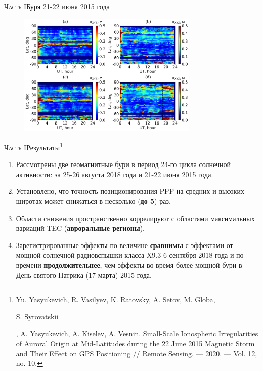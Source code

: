 \begin{frame}{\textsc{Часть I}}{Буря 21-22 июня 2015 года}
\begin{figure}
\includegraphics[width=0.77\textwidth]{../fig/2015-172-173.png}   
\end{figure} 
\end{frame}

\begin{frame}{\textsc{Часть I}}{Результаты\footnote[1]{{\tiny Yu. Yasyukevich, R. Vasilyev, K. Ratovsky, A. Setov, M. Globa, \begin{bf}S. Syrovatskii\end{bf}, A. Yasyukevich, A. Kiselev, A. Vesnin. Small-Scale Ionospheric Irregularities of Auroral Origin at Mid-Latitudes during the 22 June 2015 Magnetic Storm and Their Effect on GPS Positioning // \href{http://dx.doi.org/10.3390/rs12101579}{Remote Sensing}. --- 2020. --- Vol. 12, no. 10.}}}
\begin{enumerate}
\justifying
\item Рассмотрены две геомагнитные бури в период 24-го цикла солнечной активности: за 25-26 августа 2018 года и 21-22 июня 2015 года.
\item Установлено, что точность позиционирования PPP на средних и высоких широтах может снижаться в несколько (\textbf{до 5}) раз.
\item Области снижения пространственно коррелируют с областями максимальных вариаций TEC (\textbf{авроральные регионы}). 
\item Зарегистрированные эффекты по величине \textbf{сравнимы} с эффектами от мощной солнечной радиовспышки класса X9.3 6 сентября 2018 года и по времени \textbf{продолжительнее}, чем эффекты во время более мощной бури в День святого Патрика (17 марта) 2015 года.
\end{enumerate}  
\end{frame}